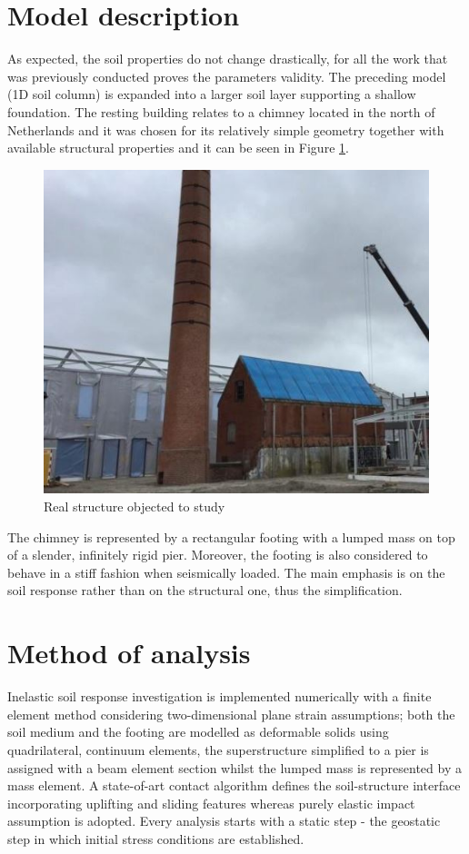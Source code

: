 \documentclass[10pt,a4paper]{report}
\begin{document}
	\section{Model description}
	As expected, the soil properties do not change drastically, for all the work that was previously conducted proves the parameters validity. The preceding model (1D soil column) is expanded into a larger soil layer supporting a shallow foundation. The resting building relates to a chimney located in the north of Netherlands and it was chosen for its relatively simple geometry together with available structural properties and it can be seen in Figure \ref{chimney}.
	\begin{figure}[!h]
		\centering
		\includegraphics[width=0.7\linewidth]{"chimney"}
		\caption{Real structure objected to study}
		\label{chimney}
	\end{figure} 
	
	The chimney is represented by a rectangular footing with a lumped mass on top of a slender, infinitely rigid pier. Moreover, the footing is also considered to behave in a stiff fashion when seismically loaded. The main emphasis is on the soil response rather than on the structural one, thus the simplification.
	
\section{Method of analysis}
Inelastic soil response investigation is implemented numerically with a finite element method considering two-dimensional plane strain assumptions; both the soil medium and the footing are modelled as deformable solids using quadrilateral, continuum elements, the superstructure simplified to a pier is assigned with a beam element section whilst the lumped mass is represented by a mass element. A state-of-art contact algorithm defines the soil-structure interface incorporating uplifting and sliding features whereas purely elastic impact assumption is adopted. Every analysis starts with a static step - the geostatic step in which initial stress conditions are established.  
\end{document}
